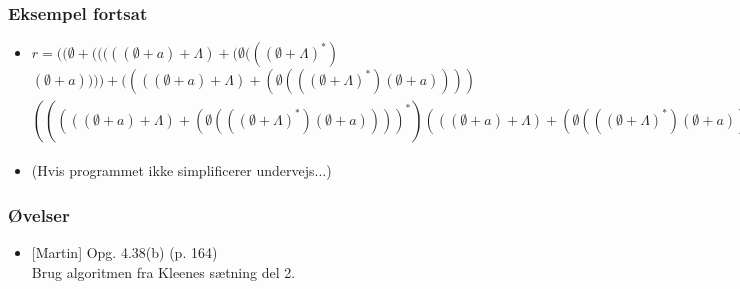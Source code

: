 \begin{frame}
\frametitle{Eksempel fortsat}
\begin{itemize}[<+->]
\item \tiny{$r = ((\emptyset+(((((\emptyset +a)+\Lambda)+(\emptyset (((\emptyset +\Lambda )^*)$$(\emptyset +a))))+((((\emptyset +a)+\Lambda )+(\emptyset (((\emptyset +\Lambda )^*)(\emptyset +a) )))$$(((((\emptyset +a)+\Lambda )+(\emptyset (((\emptyset +\Lambda )^*)(\emptyset +a))))^*)(((\emptyset +a)+\Lambda )+(\emptyset (((\emptyset +\Lambda )^*)(\emptyset +a)))))))+((((\emptyset +b)+(\emptyset (((\emptyset +\Lambda )^*)(\emptyset +b))))+((((\emptyset +a)+\Lambda )+(\emptyset (((\emptyset +\Lambda )^*)(\emptyset +a))))(((((\emptyset +a)+\Lambda )+(\emptyset (((\emptyset +\Lambda )^*)(\emptyset +a))))^*)((\emptyset +b)+(\emptyset (((\emptyset +\Lambda )^*)(\emptyset +b)))))))(((((\emptyset +\Lambda )+((\emptyset +b)(((\emptyset +\Lambda )^*)(\emptyset +b))))+(((\emptyset +a)+((\emptyset +b)(((\emptyset +\Lambda )^*)(\emptyset +a))))(((((\emptyset +a)+\Lambda )+(\emptyset (((\emptyset +\Lambda )^*)(\emptyset +a))))^*)((\emptyset +b)+(\emptyset (((\emptyset +\Lambda )^*)(\emptyset +b)))))))^*)(((\emptyset +a)+((\emptyset +b)(((\emptyset +\Lambda )^*)(\emptyset +a))))+(((\emptyset +a)+((\emptyset +b)(((\emptyset +\Lambda )^*)(\emptyset +a))))(((((\emptyset +a)+\Lambda )+(\emptyset (((\emptyset +\Lambda )^*)(\emptyset +a))))^*)(((\emptyset +a)+\Lambda )+(\emptyset (((\emptyset +\Lambda )^*)(\emptyset +a)))))))))))+((((\emptyset +b)+(\emptyset (((\emptyset +\Lambda )^*)(\emptyset +b))))+((((\emptyset +a)+\Lambda )+(\emptyset (((\emptyset +\Lambda )^*)(\emptyset +a))))(((((\emptyset +a)+\Lambda )+(\emptyset (((\emptyset +\Lambda )^*)(\emptyset +a))))^*)((\emptyset +b)+(\emptyset (((\emptyset +\Lambda )^*)(\emptyset +b)))))))+((((\emptyset +b)+(\emptyset (((\emptyset +\Lambda )^*)(\emptyset +b))))+((((\emptyset +a)+\Lambda )+(\emptyset (((\emptyset +\Lambda )^*)(\emptyset +a))))(((((\emptyset +a)+\Lambda )+(\emptyset (((\emptyset +\Lambda )^*)(\emptyset +a))))^*)((\emptyset +b)+(\emptyset (((\emptyset +\Lambda )^*)(\emptyset +b)))))))(((((\emptyset +\Lambda )+((\emptyset +b)(((\emptyset +\Lambda )^*)(\emptyset +b))))+(((\emptyset +a)+((\emptyset +b)(((\emptyset +\Lambda )^*)(\emptyset +a))))(((((\emptyset +a)+\Lambda )+(\emptyset (((\emptyset +\Lambda )^*)(\emptyset +a))))^*)((\emptyset +b)+(\emptyset (((\emptyset +\Lambda )^*)(\emptyset +b)))))))^*)(((\emptyset +\Lambda )+((\emptyset +b)(((\emptyset +\Lambda )^*)(\emptyset +b))))+(((\emptyset +a)+((\emptyset +b)(((\emptyset +\Lambda )^*)(\emptyset +a))))(((((\emptyset +a)+\Lambda )+(\emptyset (((\emptyset +\Lambda )^*)(\emptyset +a))))^*)((\emptyset +b)+(\emptyset (((\emptyset +\Lambda )^*)(\emptyset +b))))))))))) $}
\item (Hvis programmet ikke simplificerer undervejs...)
\end{itemize}
\end{frame}
\begin{frame}
\frametitle{Øvelser}
\begin{itemize}
\item{} [Martin] Opg. 4.38(b) (p. 164)\\
Brug algoritmen fra Kleenes sætning del 2.
\end{itemize}
\end{frame}

